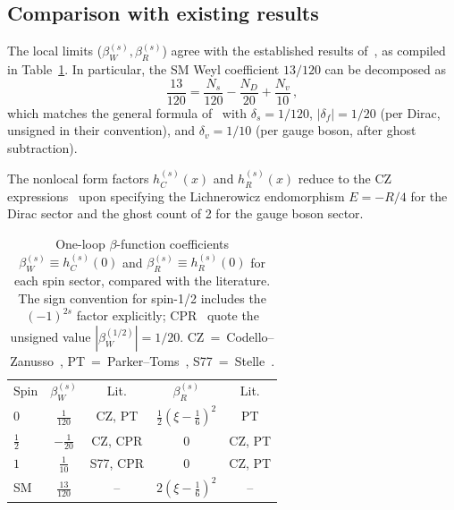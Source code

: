 \documentclass[aps,prd,twocolumn,superscriptaddress,nofootinbib,floatfix]{revtex4-2}
\begin{document}
\subsection{Comparison with existing results}

The local limits ($\beta_W^{(s)}, \beta_R^{(s)}$) agree with the established
results of~\cite{Stelle:1976gc,Codello:2008vh,Parker:2009uva,Avramidi:2000bm},
as compiled in Table~\ref{tab:beta}.
In particular, the SM Weyl coefficient $13/120$ can be decomposed as
\begin{equation}
  \frac{13}{120} = \frac{N_s}{120}
    - \frac{N_D}{20} + \frac{N_v}{10}\,,
\end{equation}
which matches the general formula of~\cite{Codello:2008vh} with
$\delta_s = 1/120$, $|\delta_f| = 1/20$ (per Dirac, unsigned in their
convention), and $\delta_v = 1/10$ (per gauge boson, after ghost subtraction).

The nonlocal form factors $h_C^{(s)}(x)$ and $h_R^{(s)}(x)$ reduce to the CZ
expressions~\cite{Codello:2012kq} upon specifying the Lichnerowicz endomorphism
$E = -R/4$ for the Dirac sector and the ghost count of 2 for the gauge boson
sector.

\begin{table}[t]
\caption{One-loop $\beta$-function coefficients $\beta_W^{(s)} \equiv
h_C^{(s)}(0)$ and $\beta_R^{(s)} \equiv h_R^{(s)}(0)$ for each spin sector,
compared with the literature. The sign convention for spin-1/2 includes the
$(-1)^{2s}$ factor explicitly; CPR~\cite{Codello:2008vh} quote the unsigned
value $|\beta_W^{(1/2)}| = 1/20$. CZ~=~Codello--Zanusso~\cite{Codello:2012kq},
PT~=~Parker--Toms~\cite{Parker:2009uva}, S77~=~Stelle~\cite{Stelle:1976gc}.}
\label{tab:beta}
\begin{ruledtabular}
\begin{tabular}{lcccc}
Spin & $\beta_W^{(s)}$ & Lit. & $\beta_R^{(s)}$ & Lit. \\
\colrule
$0$ & $\frac{1}{120}$ & CZ, PT &
  $\frac{1}{2}\!\left(\xi\!-\!\frac{1}{6}\right)^{\!2}$ & PT \\[3pt]
$\frac{1}{2}$ & $-\frac{1}{20}$ & CZ, CPR &
  $0$ & CZ, PT \\[3pt]
$1$ & $\frac{1}{10}$ & S77, CPR &
  $0$ & CZ, PT \\[3pt]
\colrule
SM & $\frac{13}{120}$ & -- &
  $2\!\left(\xi\!-\!\frac{1}{6}\right)^{\!2}$ & -- \\
\end{tabular}
\end{ruledtabular}
\end{table}
\end{document}

